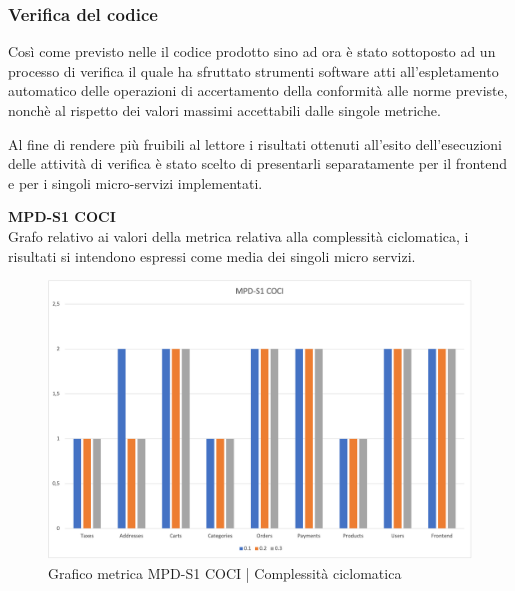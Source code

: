 \subsubsection{Verifica del codice}
Così come previsto nelle  il codice prodotto sino ad ora è stato sottoposto ad un processo di verifica il quale 
ha sfruttato strumenti software atti all'espletamento automatico delle operazioni di accertamento della conformità alle norme previste, nonchè
al rispetto dei valori massimi accettabili dalle singole metriche.

Al fine di rendere più fruibili al lettore i risultati ottenuti all'esito dell'esecuzioni delle attività di verifica è stato scelto di presentarli
separatamente per il frontend e per i singoli micro-servizi implementati.


\begin{center}
    \textbf{MPD-S1 COCI} \\
    Grafo relativo ai valori della metrica relativa alla complessità ciclomatica, i risultati si intendono espressi come media dei singoli
    micro servizi.
    \begin{figure}[!htb]
        \centering
        \includegraphics[scale=0.60]{res/images/RQcoci.png}
        \caption{Grafico metrica MPD-S1 COCI | Complessità ciclomatica}
    \end{figure}
    \begin{center}
        
    \end{center}


\end{center}
